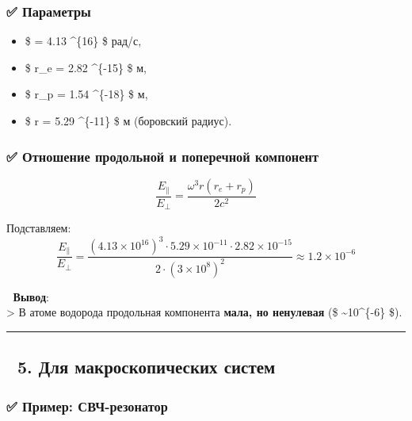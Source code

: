 \documentclass[11pt]{article}
\providecommand{\tightlist}{%
      \setlength{\itemsep}{0pt}\setlength{\parskip}{0pt}}
\begin{document}
\subsubsection{✅
Параметры}\label{ux43fux430ux440ux430ux43cux435ux442ux440ux44b}

\begin{itemize}
\tightlist
\item
  \$ \omega = 4.13 \^{}\{16\} \$ рад/с,
\item
  \$ r\_e = 2.82 \^{}\{-15\} \$ м,
\item
  \$ r\_p = 1.54 \^{}\{-18\} \$ м,
\item
  \$ r = 5.29 \^{}\{-11\} \$ м (боровский радиус).
\end{itemize}

\subsubsection{✅ Отношение продольной и поперечной
компонент}\label{ux43eux442ux43dux43eux448ux435ux43dux438ux435-ux43fux440ux43eux434ux43eux43bux44cux43dux43eux439-ux438-ux43fux43eux43fux435ux440ux435ux447ux43dux43eux439-ux43aux43eux43cux43fux43eux43dux435ux43dux442}

\[
\frac{E_{\parallel}}{E_{\perp}} = \frac{\omega^3 r (r_e + r_p)}{2c^2}
\]

Подставляем: \[
\frac{E_{\parallel}}{E_{\perp}} = \frac{(4.13 \times 10^{16})^3 \cdot 5.29 \times 10^{-11} \cdot 2.82 \times 10^{-15}}{2 \cdot (3 \times 10^8)^2} \approx 1.2 \times 10^{-6}
\]

📌 \textbf{Вывод}:\\
\textgreater{} В атоме водорода продольная компонента \textbf{мала, но
ненулевая} (\$ \sim 10\^{}\{-6\} \$).

\begin{center}\rule{0.5\linewidth}{\linethickness}\end{center}

\subsection{🔹 5. Для макроскопических
систем}\label{ux434ux43bux44f-ux43cux430ux43aux440ux43eux441ux43aux43eux43fux438ux447ux435ux441ux43aux438ux445-ux441ux438ux441ux442ux435ux43c}

\subsubsection{✅ Пример:
СВЧ-резонатор}\label{ux43fux440ux438ux43cux435ux440-ux441ux432ux447-ux440ux435ux437ux43eux43dux430ux442ux43eux440}
\end{document}
